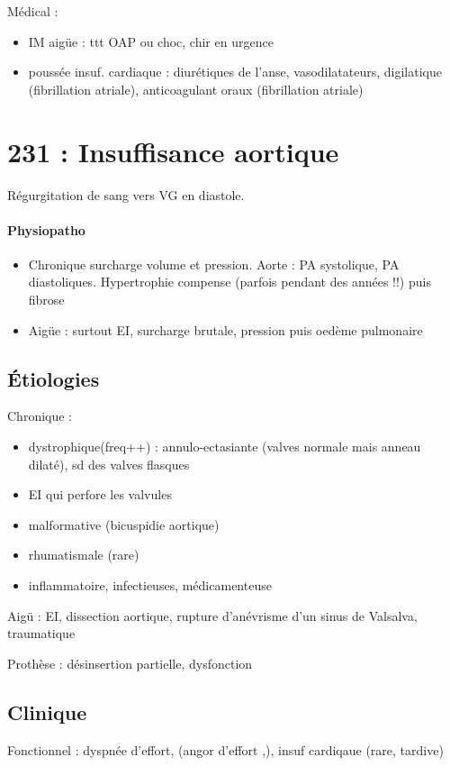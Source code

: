 \documentclass{article}
\begin{document}
Médical :
\begin{itemize}
  \item IM aigüe : ttt OAP ou choc, chir en urgence
  \item poussée insuf. cardiaque : diurétiques de l'anse, vasodilatateurs,
    digilatique (fibrillation atriale), anticoagulant oraux (fibrillation
    atriale)
\end{itemize}

\section{231 : Insuffisance aortique}%
\label{sec:231_insuffisance_aortique}
Régurgitation de sang vers VG en diastole.

\paragraph{Physiopatho} 
\begin{itemize}
  \item Chronique
surcharge volume et pression. Aorte : \inc
PA systolique, \dec PA diastoliques. 
Hypertrophie compense (parfois pendant des années !!) puis fibrose
\item Aigüe : surtout \gls{EI}, surcharge brutale,
  \inc pression puis oedème pulmonaire
\end{itemize}

\subsection{Étiologies}
Chronique :
\begin{itemize}
  \item dystrophique(freq++) : annulo-ectasiante (valves normale mais anneau
    dilaté), sd des valves flasques
  \item EI qui perfore les valvules
  \item malformative (bicuspidie aortique)
  \item rhumatismale (rare)
  \item inflammatoire, infectieuses, médicamenteuse
\end{itemize}
Aigü : EI, dissection aortique, rupture d'anévrisme d'un sinus de Valsalva,
traumatique

Prothèse : désinsertion partielle, dysfonction

\subsection{Clinique}
Fonctionnel : dyspnée d'effort, (angor d'effort ,), insuf cardiqaue (rare,
tardive)
\end{document}

